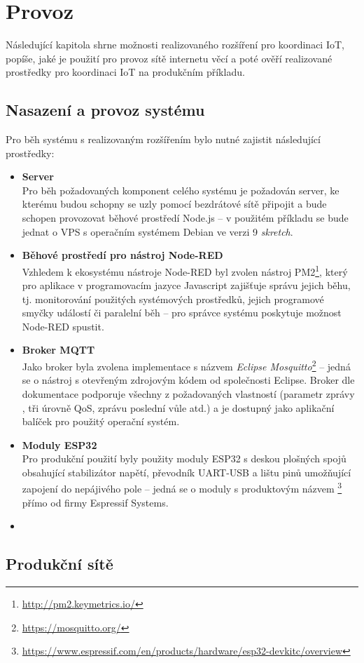 \chapter{Provoz}
\label{ch:provoz}

Následující kapitola shrne možnosti realizovaného rozšíření pro koordinaci IoT, popíše, jaké je použití pro provoz
sítě internetu věcí a poté ověří realizované prostředky pro koordinaci IoT na produkčním příkladu.

\section{Nasazení a provoz systému}\label{sec:nasazení-a-provoz-systému}
Pro běh systému s realizovaným rozšířením bylo nutné zajistit následující prostředky:
\begin{itemize}
    \item \textbf{Server} \\
    Pro běh požadovaných komponent celého systému je požadován server, ke kterému budou schopny se uzly pomocí
    bezdrátové sítě připojit a bude schopen provozovat běhové prostředí Node.js -- v použitém příkladu se bude jednat
    o VPS s operačním systémem Debian ve verzi 9 \textit{skretch}.

    \item \textbf{Běhové prostředí pro nástroj Node-RED} \\
    Vzhledem k ekosystému nástroje Node-RED byl zvolen nástroj PM2\footnote{\url{http://pm2.keymetrics.io/}}, který pro
    aplikace v programovacím jazyce Javascript zajišťuje správu jejich běhu, tj. monitorování použitých systémových
    prostředků, jejich programové smyčky událostí či paralelní běh -- pro správce systému poskytuje možnost Node-RED
    spustit.

    \item \textbf{Broker MQTT} \\
    Jako broker byla zvolena implementace s názvem \emph{Eclipse Mosquitto}\footnote{\url{https://mosquitto.org/}} --
    jedná se o nástroj s otevřeným zdrojovým kódem od společnosti Eclipse.
    Broker dle dokumentace podporuje všechny z požadovaných vlastností (parametr zprávy , tři úrovně QoS,
    zprávu poslední vůle atd.) a je dostupný jako aplikační balíček pro použitý operační systém.

    \item \textbf{Moduly ESP32} \\
    Pro produkční použití byly použity moduly ESP32 s deskou plošných spojů obsahující stabilizátor napětí, převodník
    UART-USB a lištu pinů umožňující zapojení do nepájivého pole -- jedná se o moduly s produktovým názvem
    \footnote{\url{https://www.espressif.com/en/products/hardware/esp32-devkitc/overview}}
    přímo od firmy Espressif Systems.

    \item
\end{itemize}

\section{Produkční sítě}\label{sec:site-nástroje-node-red}
